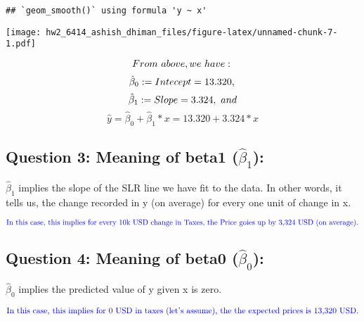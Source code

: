 \documentclass[
]{article}
\begin{document}
\begin{verbatim}
## `geom_smooth()` using formula 'y ~ x'
\end{verbatim}

\texttt{[image: hw2\_6414\_ashish\_dhiman\_files/figure-latex/unnamed-chunk-7-1.pdf]}

\[
From\ above, we\ have:\\
\] \[
\hat{\beta}_0:= Intecept = 13.320,\\
\] \[
\hat{\beta}_1:=Slope = 3.324,\ and\\
\] \[
\hat{y} = \hat{\beta}_0 +\hat{\beta}_1 * x = 13.320 + 3.324 *x
\]

\hypertarget{question-3-meaning-of-beta1-hatbeta_1}{%
\subsection{\texorpdfstring{Question 3: Meaning of beta1
(\(\hat{\beta}_1\)):}{Question 3: Meaning of beta1 (\textbackslash hat\{\textbackslash beta\}\_1):}}\label{question-3-meaning-of-beta1-hatbeta_1}}

\(\hat{\beta}_1\) implies the slope of the SLR line we have fit to the
data. In other words, it tells us, the change recorded in y (on average)
for every one unit of change in x.

\(\color{blue}{\text{In this case, this implies for every 10k USD change in Taxes, the Price goies up by 3,324 USD (on average).}}\)

\hypertarget{question-4-meaning-of-beta0-hatbeta_0}{%
\subsection{\texorpdfstring{Question 4: Meaning of beta0
(\(\hat{\beta}_0\)):}{Question 4: Meaning of beta0 (\textbackslash hat\{\textbackslash beta\}\_0):}}\label{question-4-meaning-of-beta0-hatbeta_0}}

\(\hat{\beta}_0\) implies the predicted value of y given x is zero.

\(\color{blue}{\text{In this case, this implies for 0 USD in taxes (let's assume), the the expected prices is 13,320 USD}}.\)
\end{document}
